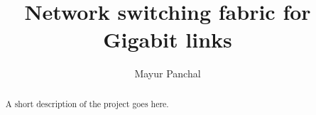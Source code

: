 \documentclass[11pt
              , a4paper
              , twoside
              , openright
              ]{report}
\title{Network switching fabric for Gigabit links}
\author{Mayur Panchal}
\date{}
\begin{document}
\frontmatter



\begin{abstract}

A short description of the project goes here.

\end{abstract}


\maketitle

%

\tableofcontents



\mainmatter







\backmatter



%
{}

\end{document}
